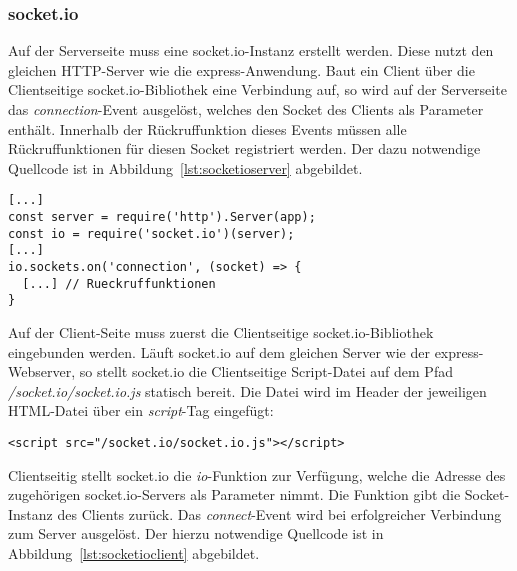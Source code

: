 \subsubsection{socket.io}
Auf der Serverseite muss eine socket.io-Instanz erstellt werden. Diese nutzt den gleichen \acs{HTTP}-Server wie die express-Anwendung. Baut ein Client über die Clientseitige socket.io-Bibliothek eine Verbindung auf, so wird auf der Serverseite das \textit{connection}-Event ausgelöst, welches den Socket des Clients als Parameter enthält. Innerhalb der Rückruffunktion dieses Events müssen alle Rückruffunktionen für diesen Socket registriert werden. Der dazu notwendige Quellcode ist in Abbildung~\ref{lst:socketioserver} abgebildet.

\vspace{5pt}
\lstset{language=js, style=STYLE_CODE_JS}
\begin{minipage}{\textwidth}
\begin{singlespace}
\begin{lstlisting}[caption={Initialisierung des socket.io Servers -- Server.js}, captionpos=b, label={lst:socketioserver}]
[...]
const server = require('http').Server(app);
const io = require('socket.io')(server);
[...]
io.sockets.on('connection', (socket) => {
  [...] // Rueckruffunktionen
}
\end{lstlisting}
\end{singlespace}
\end{minipage}

Auf der Client-Seite muss zuerst die Clientseitige socket.io-Bibliothek eingebunden werden. Läuft socket.io auf dem gleichen Server wie der express-Webserver, so stellt socket.io die Clientseitige Script-Datei auf dem Pfad \textit{/socket.io/socket.io.js} statisch bereit. Die Datei wird im Header der jeweiligen HTML-Datei über ein \textit{script}-Tag eingefügt:
\lstset{style=STYLE_COMMAND_LINE_ARGUMENT_SINGLE_LINE}
\begin{lstlisting}[belowskip=-0.8 \baselineskip]
<script src="/socket.io/socket.io.js"></script>
\end{lstlisting}
\par

\vspace{11pt}
Clientseitig stellt socket.io die \textit{io}-Funktion zur Verfügung, welche die Adresse des zugehörigen socket.io-Servers als Parameter nimmt. Die Funktion gibt die Socket-Instanz des Clients zurück. Das \textit{connect}-Event wird bei erfolgreicher Verbindung zum Server ausgelöst. Der hierzu notwendige Quellcode ist in Abbildung~\ref{lst:socketioclient} abgebildet.

